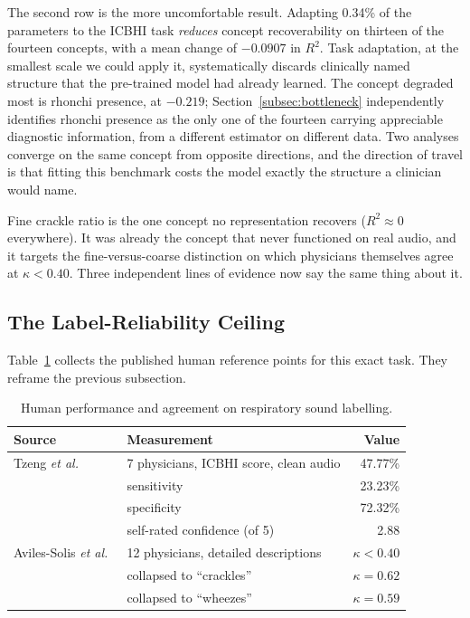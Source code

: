 \documentclass[journal,onecolumn]{IEEEtran}
\begin{document}
The second row is the more uncomfortable result. Adapting 0.34\% of the parameters to
the ICBHI task \emph{reduces} concept recoverability on thirteen of the fourteen
concepts, with a mean change of $-0.0907$ in $R^2$. Task adaptation, at the smallest
scale we could apply it, systematically discards clinically named structure that the
pre-trained model had already learned. The concept degraded most is rhonchi presence,
at $-0.219$; Section~\ref{subsec:bottleneck} independently identifies rhonchi presence
as the only one of the fourteen carrying appreciable diagnostic information, from a
different estimator on different data. Two analyses converge on the same concept from
opposite directions, and the direction of travel is that fitting this benchmark costs
the model exactly the structure a clinician would name.

Fine crackle ratio is the one concept no representation recovers ($R^2 \approx 0$
everywhere). It was already the concept that never functioned on real audio, and it
targets the fine-versus-coarse distinction on which physicians themselves agree at
$\kappa<0.40$. Three independent lines of evidence now say the same thing about it.

\subsection{The Label-Reliability Ceiling}
\label{subsec:ceiling}

Table~\ref{tab:human} collects the published human reference points for this exact
task. They reframe the previous subsection.

\begin{table}[!t]
\centering
\caption{Human performance and agreement on respiratory sound labelling.}
\label{tab:human}
\begin{tabular}{llr}
\toprule
Source & Measurement & Value \\
\midrule
Tzeng \emph{et al.}~\cite{tzeng2025jmir} & 7 physicians, ICBHI score, clean audio & 47.77\% \\
                                          & \quad sensitivity & 23.23\% \\
                                          & \quad specificity & 72.32\% \\
                                          & \quad self-rated confidence (of 5) & 2.88 \\
\midrule
Aviles-Solis \emph{et al.}~\cite{aviles2016kappa} & 12 physicians, detailed descriptions & $\kappa < 0.40$ \\
                                          & \quad collapsed to ``crackles'' & $\kappa = 0.62$ \\
                                          & \quad collapsed to ``wheezes'' & $\kappa = 0.59$ \\
\bottomrule
\end{tabular}
\end{table}
\end{document}
